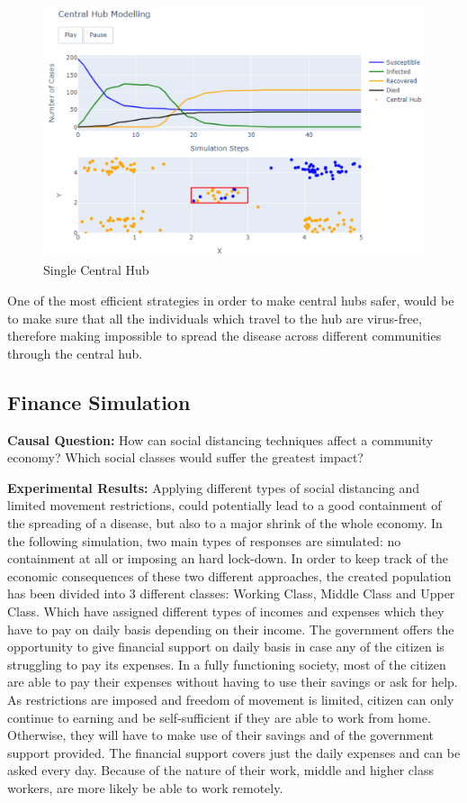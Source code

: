\begin{figure}[ht!]%
    \centering
    \includegraphics[width=0.85\linewidth]{latex/images/hubs1.pdf}
    \caption{Single Central Hub}
    \label{hub}
\end{figure}

One of the most efficient strategies in order to make central hubs safer, would be to make sure that all the individuals which travel to the hub are virus-free, therefore making impossible to spread the disease across different communities through the central hub.

\subsection{Finance Simulation}

\textbf{Causal Question:} How can social distancing techniques affect a community economy? Which social classes would suffer the greatest impact?

\textbf{Experimental Results:} Applying different types of social distancing and limited movement restrictions, could potentially lead to a good containment of the spreading of a disease, but also to a major shrink of the whole economy. In the following simulation, two main types of responses are simulated: no containment at all or imposing an hard lock-down. In order to keep track of the economic consequences of these two different approaches, the created population has been divided into 3 different classes: Working Class, Middle Class and Upper Class. Which have assigned different types of incomes and expenses which they have to pay on daily basis depending on their income. The government offers the opportunity to give financial support on daily basis in case any of the citizen is struggling to pay its expenses. In a fully functioning society, most of the citizen are able to pay their expenses without having to use their savings or ask for help. As restrictions are imposed and freedom of movement is limited, citizen can only continue to earning and be self-sufficient if they are able to work from home. Otherwise, they will have to make use of their savings and of the government support provided. The financial support covers just the daily expenses and can be asked every day. Because of the nature of their work, middle and higher class workers, are more likely be able to work remotely.

